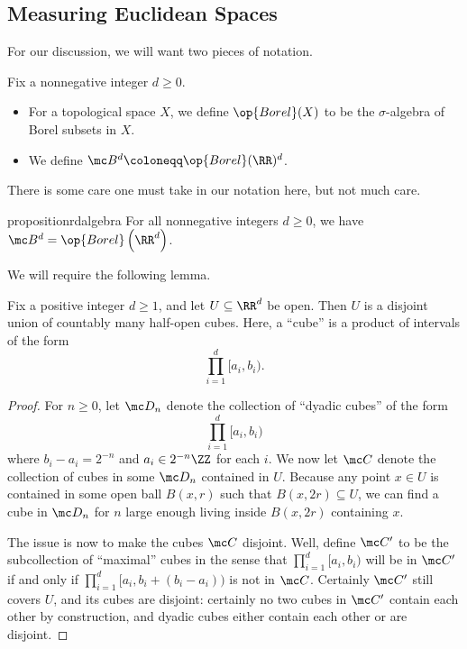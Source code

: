 \documentclass[../notes.tex]{subfiles}
\begin{document}
\subsection{Measuring Euclidean Spaces}
For our discussion, we will want two pieces of notation.
\begin{notation}
	Fix a nonnegative integer $d\ge0$.
	\begin{itemize}
		\item For a topological space $X$, we define $\op{Borel}(X)$ to be the $\sigma$-algebra of Borel subsets in $X$.
		\item We define $\mc B^d\coloneqq\op{Borel}(\RR)^d$.
	\end{itemize}
\end{notation}
There is some care one must take in our notation here, but not much care.
\begin{restatable}{proposition}{rdalgebra} \label{prop:check-borel-product}
	For all nonnegative integers $d\ge0$, we have $\mc B^d=\op{Borel}\left(\RR^d\right)$.
\end{restatable}
\noindent We will require the following lemma.
\begin{lemma} \label{lem:divide-open-to-cubes}
	Fix a positive integer $d\ge1$, and let $U\subseteq\RR^d$ be open. Then $U$ is a disjoint union of countably many half-open cubes. Here, a ``cube'' is a product of intervals of the form
	\[\prod_{i=1}^d[a_i,b_i).\]
\end{lemma}
\begin{proof}
	For $n\ge0$, let $\mc D_n$ denote the collection of ``dyadic cubes'' of the form
	\[\prod_{i=1}^d[a_i,b_i)\]
	where $b_i-a_i=2^{-n}$ and $a_i\in2^{-n}\ZZ$ for each $i$. We now let $\mc C$ denote the collection of cubes in some $\mc D_n$ contained in $U$. Because any point $x\in U$ is contained in some open ball $B(x,r)$ such that $B(x,2r)\subseteq U$, we can find a cube in $\mc D_n$ for $n$ large enough living inside $B(x,2r)$ containing $x$.

	The issue is now to make the cubes $\mc C$ disjoint. Well, define $\mc C'$ to be the subcollection of ``maximal'' cubes in the sense that $\prod_{i=1}^d[a_i,b_i)$ will be in $\mc C'$ if and only if $\prod_{i=1}^d[a_i,b_i+(b_i-a_i))$ is not in $\mc C$. Certainly $\mc C'$ still covers $U$, and its cubes are disjoint: certainly no two cubes in $\mc C'$ contain each other by construction, and dyadic cubes either contain each other or are disjoint.
\end{proof}
\end{document}
